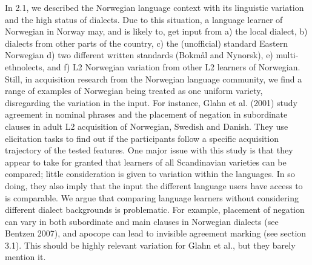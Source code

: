 \documentclass[12pt]{article}
\newenvironment{styleStandard}{\renewcommand\baselinestretch{1.0}\setlength\leftskip{0cm}\setlength\rightskip{0cm plus 1fil}\setlength\parindent{0cm}\setlength\parfillskip{0pt plus 1fil}\setlength\parskip{0in plus 1pt}\writerlistparindent\writerlistleftskip\leavevmode\normalfont\normalsize\writerlistlabel\ignorespaces}{\unskip\vspace{0in plus 1pt}\par}
\newcommand\writerlistleftskip{}
\newcommand\writerlistparindent{}
\newcommand\writerlistlabel{}
\begin{document}
\begin{styleStandard}
In 2.1, we described the Norwegian language context with its linguistic variation and the high status of dialects. Due to this situation, a language learner of Norwegian in Norway may, and is likely to, get input from a) the local dialect, b) dialects from other parts of the country, c) the (unofficial) standard Eastern Norwegian d) two different written standards (Bokmål and Nynorsk), e) multi-ethnolects, and f) L2 Norwegian variation from other L2 learners of Norwegian. Still, in acquisition research from the Norwegian language community, we find a range of examples of Norwegian being treated as one uniform variety, disregarding the variation in the input. For instance, Glahn et al. (2001) study agreement in nominal phrases and the placement of negation in subordinate clauses in adult L2 acquisition of Norwegian, Swedish and Danish. They use elicitation tasks to find out if the participants follow a specific acquisition trajectory of the tested features. One major issue with this study is that they appear to take for granted that learners of all Scandinavian varieties can be compared; little consideration is given to variation within the languages. In so doing, they also imply that the input the different language users have access to is comparable. We argue that comparing language learners without considering different dialect backgrounds is problematic. For example, placement of negation can vary in both subordinate and main clauses in Norwegian dialects (see Bentzen 2007), and apocope can lead to invisible agreement marking (see section 3.1). This should be highly relevant variation for Glahn et al., but they barely mention it. 
\end{styleStandard}
\end{document}
